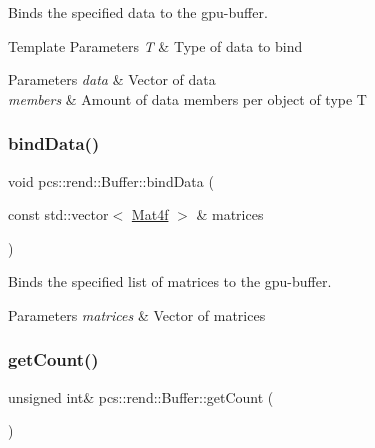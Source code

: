 Binds the specified data to the gpu-\/buffer. 


\begin{DoxyTemplParams}{Template Parameters}
{\em T} & Type of data to bind \\
\hline
\end{DoxyTemplParams}

\begin{DoxyParams}{Parameters}
{\em data} & Vector of data \\
\hline
{\em members} & Amount of data members per object of type T \\
\hline
\end{DoxyParams}
\mbox{\label{classpcs_1_1rend_1_1Buffer_a6cbc511646a70b0c7b93b65552e4b86c}} 
\subsubsection{\texorpdfstring{bind\+Data()}{bindData()}\hspace{0.1cm}{\footnotesize\ttfamily [3/3]}}
{\footnotesize\ttfamily void pcs\+::rend\+::\+Buffer\+::bind\+Data (\begin{DoxyParamCaption}\item[{const std\+::vector$<$ \hyperlink{structpcs_1_1Mat4f}{Mat4f} $>$ \&}]{matrices }\end{DoxyParamCaption})\hspace{0.3cm}{\ttfamily [inline]}}



Binds the specified list of matrices to the gpu-\/buffer. 


\begin{DoxyParams}{Parameters}
{\em matrices} & Vector of matrices \\
\hline
\end{DoxyParams}
\mbox{\label{classpcs_1_1rend_1_1Buffer_a6b946389de081d61317561addc797356}} 
\subsubsection{\texorpdfstring{get\+Count()}{getCount()}}
{\footnotesize\ttfamily unsigned int\& pcs\+::rend\+::\+Buffer\+::get\+Count (\begin{DoxyParamCaption}{ }\end{DoxyParamCaption})\hspace{0.3cm}{\ttfamily [inline]}}



